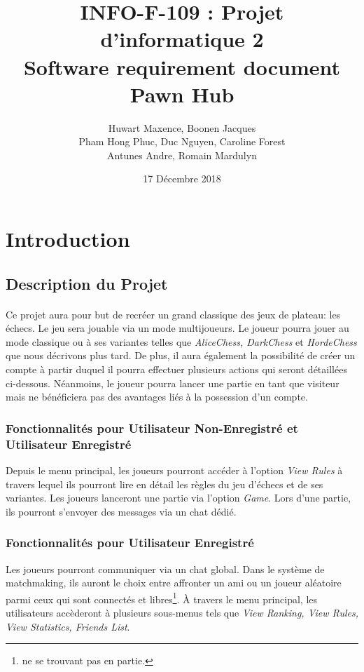 \documentclass[10pt, a4paper]{article}
\title{\LARGE{INFO-F-109 : Projet d'informatique 2 }\\
       \textbf{Software requirement document\\
	   Pawn Hub}}
\author{Huwart Maxence, Boonen Jacques\\
		Pham Hong Phuc, Duc Nguyen, Caroline Forest\\
		Antunes Andre, Romain Mardulyn}
\date{17 Décembre 2018}
\begin{document}
	\maketitle
	\newpage
	\tableofcontents %
	\newpage
	\section{Introduction}
		\subsection{Description du Projet}
			\paragraph{}Ce projet aura pour but de recréer un grand classique des jeux de plateau: les échecs. Le jeu sera jouable via un mode multijoueurs. Le joueur pourra jouer au mode classique ou à ses variantes telles que  {\itshape AliceChess, DarkChess} et {\itshape HordeChess} que nous décrivons plus tard. De plus, il aura également la possibilité de créer un compte à partir duquel il pourra effectuer plusieurs actions qui seront détaillées ci-dessous. Néanmoins, le joueur pourra lancer une partie en tant que visiteur mais ne bénéficiera pas des avantages liés à la possession d'un compte.
			
			\subsubsection{Fonctionnalités pour Utilisateur Non-Enregistré et Utilisateur Enregistré}Depuis le menu principal, les joueurs pourront accéder à l'option {\itshape View Rules} à travers lequel ils pourront lire en détail les règles du jeu d'échecs et de ses variantes. Les joueurs lanceront une partie via l'option {\itshape Game}. Lors d'une partie, ils pourront s'envoyer des messages via un chat dédié.
			
			\subsubsection{Fonctionnalités pour Utilisateur Enregistré}Les joueurs pourront communiquer via un chat global. Dans le système de matchmaking, ils auront le choix entre affronter un ami ou un joueur aléatoire parmi ceux qui sont connectés et libres\footnote{ne se trouvant pas en partie.}. À travers le menu principal, les utilisateurs accèderont à plusieurs sous-menus tels que {\itshape View Ranking, View Rules, View Statistics, Friends List}.%
			
\end{document}

